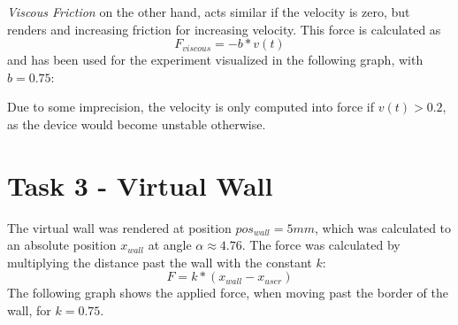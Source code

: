   \begin{figure}[H]
    \centering
  \end{figure}

  \textit{Viscous Friction} on the other hand, acts similar if the velocity is zero, but renders and increasing friction for increasing velocity. This force is calculated as
  \begin{equation*}
    F_{viscous} = -b * v(t)
  \end{equation*}
  and has been used for the experiment visualized in the following graph, with $b = 0.75$:

  \begin{figure}[H]
    \centering
  \end{figure}

  Due to some imprecision, the velocity is only computed into force if $v(t) > 0.2$, as the device would become unstable otherwise.

  \section*{Task 3 - Virtual Wall}

  The virtual wall was rendered at position $pos_{wall} = 5mm$, which was calculated to an absolute position $x_{wall}$ at angle $\alpha \approx 4.76$. The force was calculated by multiplying the distance past the wall with the constant $k$:
  \begin{equation*}
    F = k * (x_{wall} - x_{user})
  \end{equation*}
  The following graph shows the applied force, when moving past the border of the wall, for $k = 0.75$.

